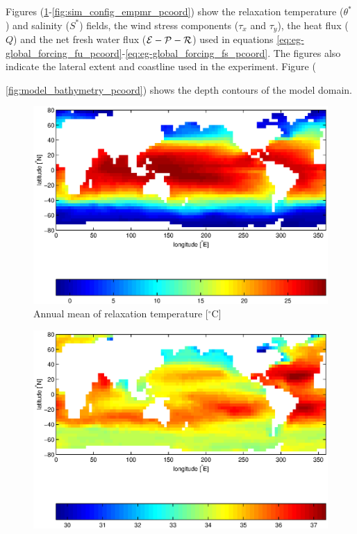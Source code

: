 Figures (\ref{fig:sim_config_tclim_pcoord}-\ref{fig:sim_config_empmr_pcoord}) show
the relaxation temperature ($\theta^{\ast}$) and salinity ($S^{\ast}$)
fields, the wind stress components ($\tau_x$ and $\tau_y$), the heat
flux ($Q$) and the net fresh water flux (${\cal E} - {\cal P} - {\cal
  R}$) used in equations
\ref{eq:eg-global_forcing_fu_pcoord}-\ref{eq:eg-global_forcing_fs_pcoord}.
The figures also indicate the lateral extent and coastline used in the
experiment.  Figure ({\ref{fig:model_bathymetry_pcoord}) shows the depth
  contours of the model domain.
\begin{figure}[t]
  \begin{center}
    \includegraphics[width=.9\textwidth]{s_examples/global_oce_in_p/sst}
    \caption{Annual mean of relaxation temperature [$^{\circ}\mathrm{C}$]}
    \label{fig:sim_config_tclim_pcoord}
  \end{center}
\end{figure}
\begin{figure}[t]
  \begin{center}
    \includegraphics[width=.9\textwidth]{s_examples/global_oce_in_p/sss}

\end{center}
\end{figure}}
